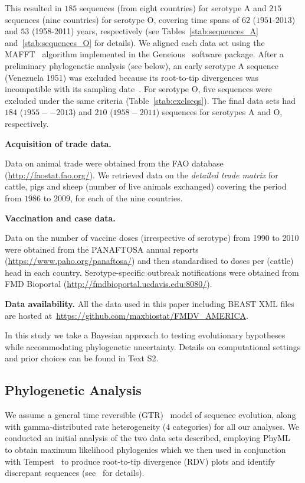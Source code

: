 \documentclass[10pt]{article}
\begin{document}
This resulted in $185$ sequences (from eight countries) for serotype A and $215$ sequences (nine countries) for serotype O, covering time spans of $62$ ($1951$-$2013$) and $53$ (1958-2011) years, respectively (see Tables~\ref{stab:sequences_A} and~\ref{stab:sequences_O} for details).
We aligned each data set using the MAFFT~\citep{Katoh2002} algorithm implemented in the Geneious~\citep{Kearse2012} software package.
After a preliminary phylogenetic analysis (see below), an early serotype A sequence (Venezuela 1951) was excluded because its root-to-tip divergences was incompatible with its sampling date~\citep{Rambaut2016}.
For serotype O, five sequences were excluded under the same criteria (Table~\ref{stab:exclseqs}).
The final data sets had $184$ ($1955 -- 2013$) and $210$ ($1958-2011$) sequences for serotypes A and O, respectively.

\textbf{Acquisition of trade data.}

Data on animal trade were obtained from the FAO database (\url{http://faostat.fao.org/}).
We retrieved data on the \textit{detailed trade matrix} for cattle, pigs and sheep (number of live animals exchanged) covering the period from $1986$ to $2009$, for each of the nine countries.

\textbf{Vaccination and case data.}

Data on the number of vaccine doses (irrespective of serotype) from 1990 to 2010 were obtained from the PANAFTOSA annual reports (\url{https://www.paho.org/panaftosa/}) and then standardised to doses per (cattle) head in each country.
Serotype-specific outbreak notifications were obtained from FMD Bioportal (\url{http://fmdbioportal.ucdavis.edu:8080/}).

\textbf{Data availability.} All the data used in this paper including BEAST XML files are hosted at~\url{https://github.com/maxbiostat/FMDV_AMERICA}.

In this study we take a Bayesian approach to testing evolutionary hypotheses while accommodating phylogenetic uncertainty.
Details on computational settings and prior choices can be found in Text S2.

\subsection*{Phylogenetic Analysis}

We assume a general time reversible (GTR)~\citep{Tavare1986} model of sequence evolution, along with gamma-distributed rate heterogeneity (4 categories) for all our analyses.
We conducted an initial analysis of the two data sets described, employing PhyML~\citep{Guindon2003} to obtain maximum likelihood phylogenies which we then used in conjunction with Tempest~\citep{Rambaut2016} to produce root-to-tip divergence (RDV) plots and identify discrepant sequences (see~\cite{Rambaut2016} for details).
\end{document}
